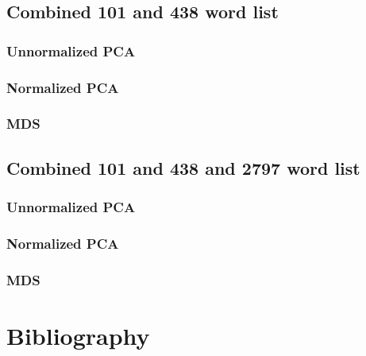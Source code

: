 \documentclass[eric_thesis.tex]{subfiles}
\begin{document}
\section{Combined 101 and 438 word list}
\subsection{Unnormalized PCA}
\label{app:rankedwordlists:438and101words:unnormalized}

\subsection{Normalized PCA}
\label{app:rankedwordlists:438and101words:normalized}

\subsection{MDS}
\label{app:rankedwordlists:438and101words:mds}


\section{Combined 101 and 438 and 2797 word list}
\label{app:rankedwordlists:2797and438and101words}
\subsection{Unnormalized PCA}
\label{app:rankedwordlists:2797and438and101words:unnormalized}

\subsection{Normalized PCA}
\label{app:rankedwordlists:2797and438and101words:normalized}

\subsection{MDS}
\label{app:rankedwordlists:2797and438and101words:mds}



\chapter{Bibliography}


\end{document}

